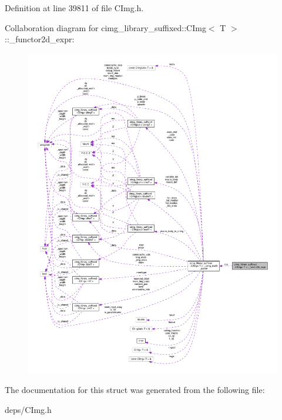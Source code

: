 Definition at line 39811 of file C\+Img.\+h.



Collaboration diagram for cimg\+\_\+library\+\_\+suffixed\+:\+:C\+Img$<$ T $>$\+:\+:\+\_\+functor2d\+\_\+expr\+:
\nopagebreak
\begin{figure}[H]
\begin{center}
\leavevmode
\includegraphics[width=350pt]{dd/d3a/structcimg__library__suffixed_1_1CImg_1_1__functor2d__expr__coll__graph}
\end{center}
\end{figure}


The documentation for this struct was generated from the following file\+:\begin{DoxyCompactItemize}
\item 
deps/C\+Img.\+h\end{DoxyCompactItemize}
